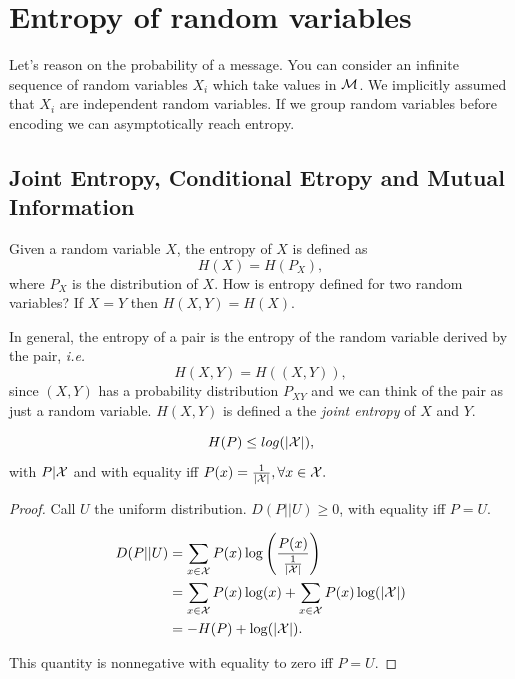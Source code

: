 \chapter{Entropy of random variables}

Let's reason on the probability of a message. You can consider an infinite sequence of random variables $X_i$ which take values in $\mathcal{M}$. We implicitly assumed that $X_i$ are independent random variables. If we group random variables before encoding we can asymptotically reach entropy.

\section{Joint Entropy, Conditional Etropy and Mutual Information}

Given a random variable $X$, the entropy of $X$ is defined as $$H(X) = H(P_X),$$ where $P_X$ is the distribution of $X$. How is entropy defined for two random variables? If $X=Y$ then $H(X, Y) = H(X).$

\begin{definition}
In general, the entropy of a pair is the entropy of the random variable derived by the pair, \emph{i.e.}
\begin{equation}
H(X, Y) = H((X, Y)), 
\end{equation}
since $(X, Y)$ has a probability distribution $P_{XY}$ and we can think of the pair as just a random variable. $H(X, Y)$ is defined a the \emph{joint entropy} of $X$ and $Y$. 
\end{definition}



\begin{prop}
 $$H(P) \leq log(|\mathcal{X}|),$$ with $P|\mathcal{X}$ and with equality iff $P(x) = \frac{1}{|\mathcal{X}|}, \forall x \in \mathcal{X}.$
\end{prop}
\begin{proof} Call $U$ the uniform distribution. $D(P||U)\geq 0$, with equality iff $P = U$.

\begin{align*}
 D(P||U) & = \sum_{x \in \mathcal{X}} P(x)\log\left(\dfrac{P(x)}{\frac{1}{|\mathcal{X}|}}\right)\\
 & = \sum_{x \in \mathcal{X}} P(x)\log(x) + \sum_{x\in\mathcal{X}} P(x)\log(|\mathcal{X}|)\\
 & = -H(P) + \log(|\mathcal{X}|).
\end{align*}

This quantity is nonnegative with equality to zero iff $P=U.$

\end{proof}

